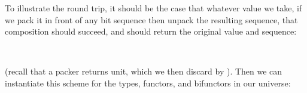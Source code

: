 \documentclass[fleqn,runningheads]{llncs}
\begin{document}
To illustrate the round trip, it should be the case that whatever value we take, if we pack it in front of any bit sequence then unpack the resulting sequence, that composition should succeed, and should return the original value and sequence:
\begin{code}%
\>[0]\AgdaSpace{}%
\AgdaSymbol{:}\AgdaSpace{}%
\AgdaSymbol{\{}\AgdaSpace{}%
\AgdaSpace{}%
\AgdaSymbol{:}\AgdaSpace{}%
\AgdaSpace{}%
\AgdaSymbol{\}}\AgdaSpace{}%
\AgdaSpace{}%
\AgdaSpace{}%
\AgdaSpace{}%
\AgdaSpace{}%
\AgdaSpace{}%
\AgdaSpace{}%
\AgdaSpace{}%
\AgdaSpace{}%
\AgdaSpace{}%
\AgdaSpace{}%
\AgdaSpace{}%
\AgdaSpace{}%
\<%
\\
\>[0]\AgdaSpace{}%
\AgdaSpace{}%
\AgdaSpace{}%
\AgdaSpace{}%
\AgdaSpace{}%
\AgdaSymbol{=}\AgdaSpace{}%
\AgdaSymbol{(}\AgdaSpace{}%
\AgdaSpace{}%
\AgdaOperator{\AgdaPostulate{>>}}\AgdaSpace{}%
\AgdaSymbol{)}\AgdaSpace{}%
\AgdaSpace{}%
\AgdaSpace{}%
\AgdaSpace{}%
\AgdaSymbol{(}\AgdaSpace{}%
\AgdaOperator{\AgdaInductiveConstructor{,}}\AgdaSpace{}%
\AgdaSymbol{)}\<%
\end{code}
(recall that a packer returns unit, which we then discard by \AgdaOperator{\AgdaPostulate{>>}}).
Then we can instantiate this scheme for the types, functors, and bifunctors in our universe:
\begingroup
\def\AgdaSpace{\hskip3pt}
\end{document}

